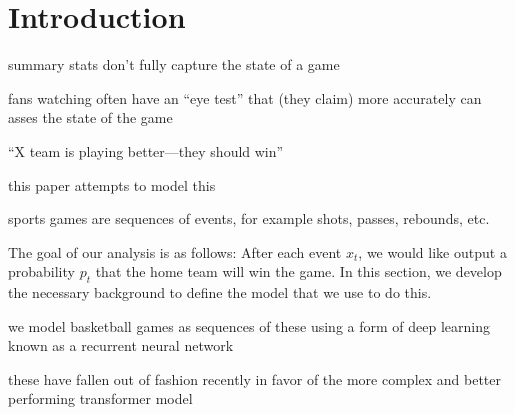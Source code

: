 \section{Introduction}

summary stats don't fully capture the state of a game

fans watching often have an ``eye test'' that (they claim) more accurately can asses the state of the game

``X team is playing better---they should win''

this paper attempts to model this

sports games are sequences of events, for example shots, passes, rebounds, etc.

The goal of our analysis is as follows: After each event $x_t$, we would like output a probability $p_t$ that the home team will win the game. In this section, we develop the necessary background to define the model that we use to do this.

we model basketball games as sequences of these using a form of deep learning known as a recurrent neural network

these have fallen out of fashion recently in favor of the more complex and better performing transformer model
